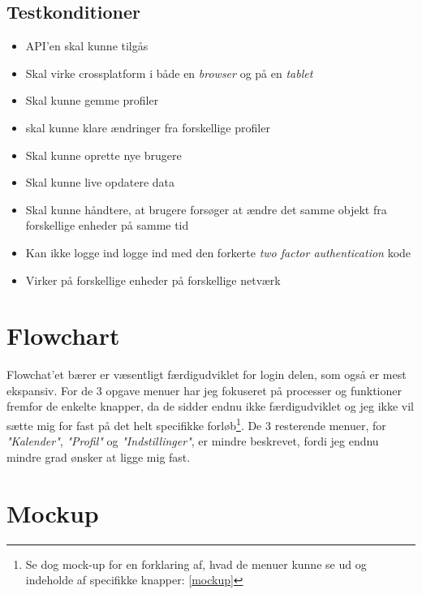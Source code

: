 \documentclass{report}
\begin{document}
\subsection{Testkonditioner}

\begin{itemize}
\item API'en skal kunne tilgås
\item Skal virke crossplatform i både en \textit{browser} og på en \textit{tablet}
\item Skal kunne gemme profiler
\item skal kunne klare ændringer fra forskellige profiler
\item Skal kunne oprette nye brugere
\item Skal kunne live opdatere data
\item Skal kunne håndtere, at brugere forsøger at ændre det samme objekt fra forskellige enheder på samme tid
\item Kan ikke logge ind logge ind med den forkerte \textit{two factor authentication} kode
\item Virker på forskellige enheder på forskellige netværk
\end{itemize}

\section{Flowchart}

Flowchat'et bærer er væsentligt færdigudviklet for login delen, som også er mest ekspansiv. For de 3 opgave menuer har jeg fokuseret på processer og funktioner fremfor de enkelte knapper, da de sidder endnu ikke færdigudviklet og jeg ikke vil sætte mig for fast på det helt specifikke forløb\footnote{Se dog mock-up for en forklaring af, hvad de menuer kunne se ud og indeholde af specifikke knapper: \autoref{mockup}}. De 3 resterende menuer, for \textit{"Kalender"}, \textit{"Profil"} og \textit{"Indstillinger"}, er mindre beskrevet, fordi jeg endnu mindre grad ønsker at ligge mig fast.\par



\section{Mockup}
\label{mockup}
\end{document}
